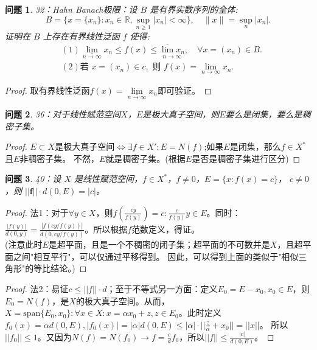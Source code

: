 \documentclass[a4paper, 12pt]{ctexart}
\newtheorem*{theorem}{问题}%
\begin{document}
\begin{theorem}
32：Hahn Banach极限：设 $B$ 是有界实数序列的全体:
$$B = \{x = \{x_n\} : x_n \in \mathbb{R}, \sup_{n \geq 1} |x_n| < \infty\}, \quad \|x\| = \sup_{n} |x_n|.$$
证明在 $B$ 上存在有界线性泛函 $f$ 使得:
\begin{align*}
    &(1) \underset{n \to \infty}{\underline{\lim}} x_n \leqslant f(x) \leqslant \underset{n \to \infty}{\overline{\lim} x_n}, \quad \forall x = (x_n) \in B. \\
    &(2) \text{若 } x = (x_n) \in c, \text{ 则 } f(x) = \lim_{n \to \infty} x_n.
\end{align*}
\end{theorem}

\begin{proof}
取有界线性泛函$f(x)=\underset{n \to \infty}{\underline{\lim}} x_n$即可验证。
\end{proof}

\begin{theorem}
36：对于线性赋范空间$X$，$E$是极大真子空间，则$E$要么是闭集，要么是稠密子集。
\end{theorem}
\begin{proof}
$E\subset X$是极大真子空间$\iff$$\exists f \in X':E=N(f)$;如果$E$是闭集，那么$f \in X^*$且$E$非稠密子集。
不然，$E$就是稠密子集。(根据$E$是否是稠密子集进行区分)
\end{proof}

\begin{theorem}
40：设 $X$ 是线性赋范空间，$f \in X^*$，$f \neq 0$，$E = \{x : f(x) = c\}$，
$c \neq 0$，则 $||\mathbf{f}||\cdot d(0, E) = |c|$。
\end{theorem}

\begin{proof}
法1：对于$\forall y \in X$，则$f(\frac{cy}{f(y)})=c:\frac{c}{f(y)}y\in E$。同时：
$\frac{|f(y)|}{d(0,y)}=\frac{|f(cy/f(y))|}{d(0,cy/f(y))}$。所以根据$f$范数定义，得证。
\\(注意此时$E$是超平面，且是一个不稠密的闭子集；超平面的不可数并是$X$，且超平面之间"相互平行"，可以仅通过平移得到。
因此，可以得到上面的类似于"相似三角形"的等比结论。)
\end{proof}

\begin{proof}
法2：易证$c\leq ||f||\cdot d$；至于不等式另一方面：定义$E_0=E-x_0,x_0 \in E$，则$E_0=N(f)$，是$X$的极大真子空间。从而，
$X=\text{span} \{E_0,x_0\}:\forall x \in X:x=\alpha x_0+z,z \in E_0$。此时定义$f_0(x)=\alpha d(0,E),|f_0(x)|=|\alpha|d(0,E)\leq |\alpha|\cdot||\frac{z}{\alpha}+x_0||=||x||$。
所以$||f_0||\leq 1$。又因为$N(f)=N(f_0)\to f=\frac{c}{d}f_0$，所以$||f||\leq \frac{|c|}{d(0,E)}$。
\end{proof}
\end{document}
